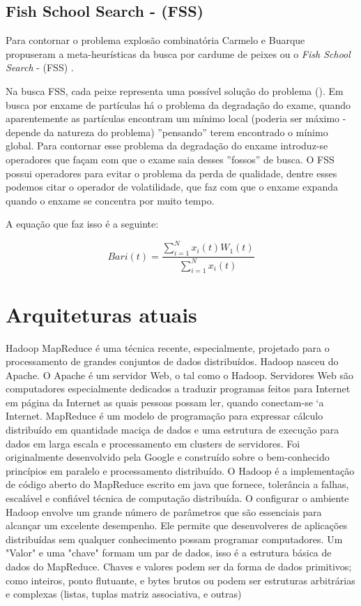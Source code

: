 \documentclass[conference,compsoc]{IEEEtran}
\begin{document}
\subsection{Fish School Search - (FSS) }\label{arte:algo:fss}

Para contornar o problema explosão combinatória Carmelo e Buarque propuseram a meta-heurísticas da busca por cardume de peixes
ou o \textit{Fish School Search} - (FSS) \cite{Filho2008}.

Na busca FSS, cada peixe representa uma possível solução do problema (\cite{Filho2008}).
Em busca por enxame de partículas há o problema da degradação do exame, quando aparentemente as partículas encontram
um mínimo local (poderia ser máximo - depende da natureza do problema) ''pensando'' terem encontrado o mínimo global.
Para contornar esse problema da degradação do enxame introduz-se operadores que façam com que o exame saia desses ''fossos''
de busca.
O FSS possui operadores para evitar o problema da perda de qualidade, dentre esses podemos citar o operador de volatilidade, 
que faz com que o enxame expanda quando o enxame se concentra por muito tempo.

A equação que faz isso é a seguinte:

\begin{equation}
Bari(t) = \frac{\sum_{i=1}^{N}x_i(t)W_1(t)}{\sum_{i=1}^{N}x_i(t)}
\end{equation}



\section{Arquiteturas atuais}

Hadoop MapReduce é uma técnica recente, especialmente, projetado para o processamento de grandes conjuntos de dados distribuídos. Hadoop nasceu do Apache. O Apache é um servidor Web, o tal como o Hadoop. Servidores Web são computadores especialmente dedicados a traduzir programas feitos para Internet em página da Internet as quais pessoas possam ler, quando conectam-se `a Internet. MapReduce é um modelo de programação para expressar cálculo distribuído em quantidade maciça de
dados e uma estrutura de execução para dados em larga escala e processamento em clusters de servidores. Foi originalmente desenvolvido pela Google e construído sobre o bem-conhecido
princípios em paralelo e processamento distribuído.
O Hadoop é a implementação de código aberto do MapReduce escrito em java que fornece, tolerância a falhas, escalável e confiável técnica de computação distribuída.
O configurar o ambiente Hadoop envolve um grande número de parâmetros que são essenciais para alcançar um excelente desempenho. Ele permite que desenvolveres de aplicações distribuídas sem qualquer conhecimento possam programar computadores. 
Um "Valor" e uma "chave" formam um par de dados, isso é a estrutura básica de dados do MapReduce. 
Chaves e valores podem ser da forma de dados primitivos; como inteiros, ponto flutuante,  e bytes brutos ou podem ser estruturas arbitrárias e complexas (listas, tuplas matriz associativa, e outras)
\end{document}
